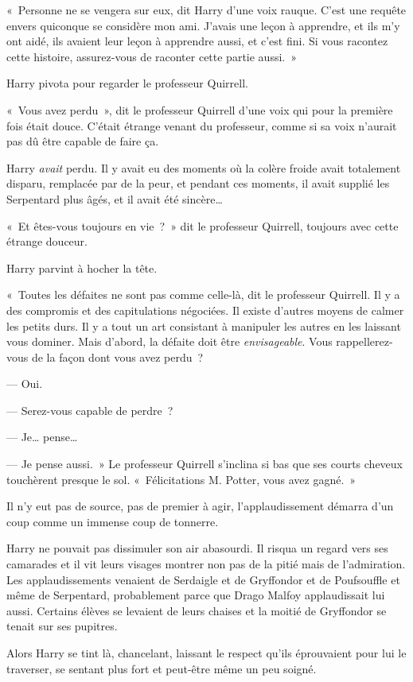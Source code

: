 «~Personne ne se vengera sur eux, dit Harry d'une voix rauque.
C'est une requête envers quiconque se considère mon ami.
J'avais une leçon à apprendre, et ils m'y ont aidé, ils avaient leur leçon à apprendre aussi, et c'est fini.
Si vous racontez cette histoire, assurez-vous de raconter cette partie aussi.~»

Harry pivota pour regarder le professeur Quirrell.

«~Vous avez perdu~», dit le professeur Quirrell d'une voix qui pour la première fois était douce.
C'était étrange venant du professeur, comme si sa voix n'aurait pas dû être capable de faire ça.

Harry \emph{avait} perdu.
Il y avait eu des moments où la colère froide avait totalement disparu, remplacée par de la peur, et pendant ces moments, il avait supplié les Serpentard plus âgés, et il avait été sincère…

«~Et êtes-vous toujours en vie~?~»
dit le professeur Quirrell, toujours avec cette étrange douceur.

Harry parvint à hocher la tête.

«~Toutes les défaites ne sont pas comme celle-là, dit le professeur Quirrell.
Il y a des compromis et des capitulations négociées.
Il existe d'autres moyens de calmer les petits durs.
Il y a tout un art consistant à manipuler les autres en les laissant vous dominer.
Mais d'abord, la défaite doit être \emph{envisageable}.
Vous rappellerez-vous de la façon dont vous avez perdu~?

--- Oui.

--- Serez-vous capable de perdre~?

--- Je… pense…

--- Je pense aussi.~»
Le professeur Quirrell s'inclina si bas que ses courts cheveux touchèrent presque le sol.
«~Félicitations M. Potter, vous avez gagné.~»

Il n'y eut pas de source, pas de premier à agir, l'applaudissement démarra d'un coup comme un immense coup de tonnerre.

Harry ne pouvait pas dissimuler son air abasourdi.
Il risqua un regard vers ses camarades et il vit leurs visages montrer non pas de la pitié mais de l'admiration.
Les applaudissements venaient de Serdaigle et de Gryffondor et de Poufsouffle et même de Serpentard, probablement parce que Drago Malfoy applaudissait lui aussi.
Certains élèves se levaient de leurs chaises et la moitié de Gryffondor se tenait sur ses pupitres.

Alors Harry se tint là, chancelant, laissant le respect qu'ils éprouvaient pour lui le traverser, se sentant plus fort et peut-être même un peu soigné.

